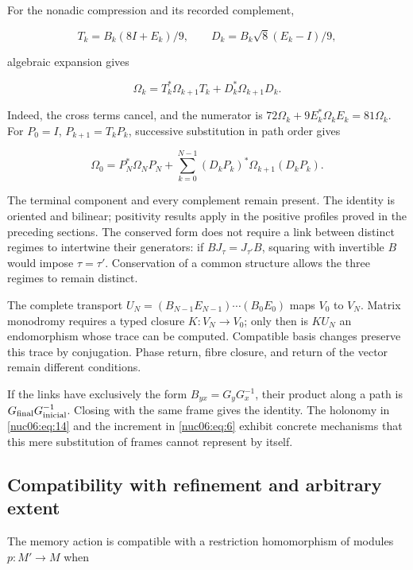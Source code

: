 For the nonadic compression and its recorded complement,

\[
T_k=B_k(8I+E_k)/9,\qquad
D_k=B_k\sqrt8(E_k-I)/9,
\]

algebraic expansion gives

\begin{equation}
\Omega_k=T_k^*\Omega_{k+1}T_k+D_k^*\Omega_{k+1}D_k.
\label{nuc06:eq:17}
\end{equation}

Indeed, the cross terms cancel, and the numerator is \(72\Omega_k+9E_k^*\Omega_kE_k=81\Omega_k\). For \(P_0=I\), \(P_{k+1}=T_kP_k\), successive substitution in path order gives

\begin{equation}
\boxed{\quad
\Omega_0=P_N^*\Omega_NP_N+
\sum_{k=0}^{N-1}(D_kP_k)^*\Omega_{k+1}(D_kP_k).
\quad}
\label{nuc06:eq:18}
\end{equation}

The terminal component and every complement remain present. The identity is oriented and bilinear; positivity results apply in the positive profiles proved in the preceding sections. The conserved form does not require a link between distinct regimes to intertwine their generators: if \(BJ_\tau=J_{\tau'}B\), squaring with invertible \(B\) would impose \(\tau=\tau'\). Conservation of a common structure allows the three regimes to remain distinct.

The complete transport \(U_N=(B_{N-1}E_{N-1})\cdots(B_0E_0)\) maps \(V_0\) to \(V_N\). Matrix monodromy requires a typed closure \(K:V_N\to V_0\); only then is \(KU_N\) an endomorphism whose trace can be computed. Compatible basis changes preserve this trace by conjugation. Phase return, fibre closure, and return of the vector remain different conditions.

If the links have exclusively the form \(B_{yx}=G_yG_x^{-1}\), their product along a path is \(G_{\rm final}G_{\rm inicial}^{-1}\). Closing with the same frame gives the identity. The holonomy in \eqref{nuc06:eq:14} and the increment in \eqref{nuc06:eq:6} exhibit concrete mechanisms that this mere substitution of frames cannot represent by itself.

\subsection{Compatibility with refinement and arbitrary extent}

The memory action is compatible with a restriction homomorphism of modules \(p:M'\to M\) when

